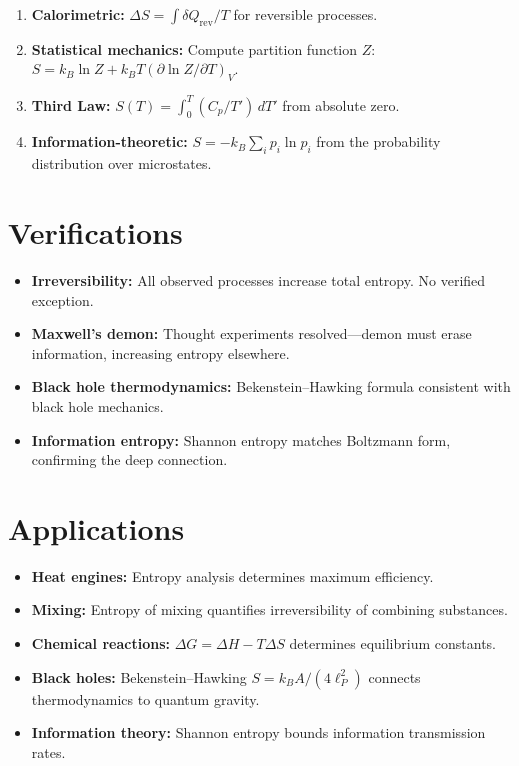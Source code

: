 \begin{enumerate}
\item \textbf{Calorimetric:} $\Delta S = \int \delta Q_{\text{rev}} / T$ for reversible processes.
\item \textbf{Statistical mechanics:} Compute partition function $Z$: $S = k_B \ln Z + k_B T (\partial \ln Z / \partial T)_V$.
\item \textbf{Third Law:} $S(T) = \int_0^T (C_p / T') \, dT'$ from absolute zero.
\item \textbf{Information-theoretic:} $S = -k_B \sum_i p_i \ln p_i$ from the probability distribution over microstates.
\end{enumerate}
\section*{Verifications}

\begin{itemize}
\item \textbf{Irreversibility:} All observed processes increase total entropy. No verified exception.
\item \textbf{Maxwell's demon:} Thought experiments resolved---demon must erase information, increasing entropy elsewhere.
\item \textbf{Black hole thermodynamics:} Bekenstein--Hawking formula consistent with black hole mechanics.
\item \textbf{Information entropy:} Shannon entropy matches Boltzmann form, confirming the deep connection.
\end{itemize}
\section*{Applications}

\begin{itemize}
\item \textbf{Heat engines:} Entropy analysis determines maximum efficiency.
\item \textbf{Mixing:} Entropy of mixing quantifies irreversibility of combining substances.
\item \textbf{Chemical reactions:} $\Delta G = \Delta H - T\Delta S$ determines equilibrium constants.
\item \textbf{Black holes:} Bekenstein--Hawking $S = k_B A / (4 \ell_P^2)$ connects thermodynamics to quantum gravity.
\item \textbf{Information theory:} Shannon entropy bounds information transmission rates.
\end{itemize}
